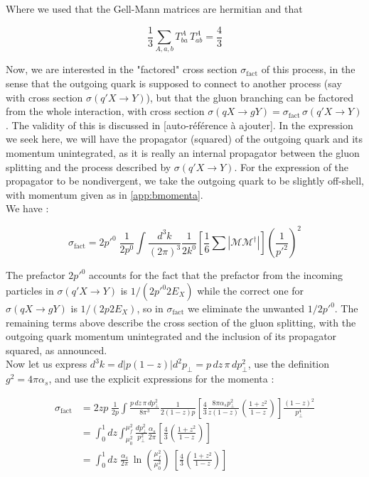 \documentclass[a4paper,10pt]{report}
\begin{document}
Where we used that the Gell-Mann matrices are hermitian and that 

\begin{equation}
  \frac{1}{3}\sum_{A, a, b} T^A_{ba}\,T^A_{ab} = \frac{4}{3}
\end{equation}

Now, we are interested in the "factored" cross section $\sigma_{\text{fact}}$ of this process, in the sense that the outgoing quark 
is supposed to connect to another process (say with cross section $\sigma(q'X \rightarrow Y)$), but that the gluon branching can be 
factored from the whole interaction, with cross section $\sigma(qX \rightarrow gY) = \sigma_{\text{fact}}\,\sigma(q'X \rightarrow Y)$. 
The validity of this is discussed in [auto-référence à ajouter].
In the expression we seek here, we will have the propagator (squared) of the outgoing quark and its 
momentum unintegrated, as it is really an internal propagator between the gluon splitting and the process described 
by $\sigma(q'X \rightarrow Y)$.
For the expression of the propagator to be nondivergent, we take the outgoing quark to be slightly off-shell, with momentum 
given as in \ref{app:bmomenta}. \\
We have :  

\begin{equation}
  \sigma_{\text{fact}} = 2p'^0\; \frac{1}{2p^0}\int \frac{d^3k}{(2\pi)^3}\frac{1}{2k^0}
   \left[\frac{1}{6}\sum |\mathcal{M}\mathcal{M}^{\dagger}|\right] \left(\frac{1}{p'^2}\right)^2
\end{equation}

The prefactor $2p'^0$ accounts for the fact that the prefactor from the incoming particles in $\sigma(q'X \rightarrow Y)$ 
is $1/(2p'^0 2E_X)$ while the correct one for $\sigma(qX \rightarrow gY)$ is $1/(2p 2E_X)$, so in $\sigma_{\text{fact}}$ 
we eliminate the unwanted $1/2p'^0$. The remaining terms above describe the cross section of the gluon splitting, 
with the outgoing quark momentum unintegrated and the inclusion of its propagator squared, as announced. \\ 
Now let us express $d^3k = d|p(1-z)|d^2p_{\perp} = p\,dz\,\pi\, dp_{\perp}^2$, use the definition $g^2 = 4\pi \alpha_s$, and use the explicit expressions for 
the momenta : 

\begin{align}
  \sigma_{\text{fact}} &= 2zp\; \frac{1}{2p}\int \frac{p\,dz\,\pi\, dp_{\perp}^2}{8\pi^3}\frac{1}{2(1-z)p}
   \left[\frac{4}{3}\frac{8\pi \alpha_s p_{\perp}^2}{z(1-z)}\left(\frac{1+z^2}{1-z}\right)\right] \frac{(1-z)^2}{p_{\perp}^4} \nonumber \\
   &= \int_{0}^{1} dz \int_{\mu_0^2}^{\mu_f^2} \frac{dp_{\perp}^2}{p_{\perp}^2} \frac{\alpha_s}{2\pi} 
   \left[\frac{4}{3}\left(\frac{1+z^2}{1-z}\right)\right] \nonumber \\ 
   &= \int_{0}^{1} dz\; \frac{\alpha_s}{2\pi}\, \ln\left(\frac{\mu_f^2}{\mu_0^2}\right)\ 
   \left[\frac{4}{3}\left(\frac{1+z^2}{1-z}\right)\right]
\end{align}
\end{document}
